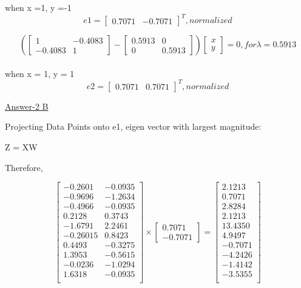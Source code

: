 \documentclass{report}
\begin{document}
\begin{flushleft}
when x =1, y =-1
\[
e1 = \begin{bmatrix}0.7071 & -0.7071\end{bmatrix}^T, normalized
\]

\begin{equation}
(\begin{bmatrix}
1 & -0.4083 \\
-0.4083 & 1
\end{bmatrix} - 
\begin{bmatrix}
0.5913 & 0 \\
0 & 0.5913
\end{bmatrix})
\begin{bmatrix}
x \\
y
\end{bmatrix}
= 0, for \lambda = 0.5913
\end{equation} \\

when x = 1, y = 1
\[
e2 = \begin{bmatrix}0.7071 & 0.7071\end{bmatrix}^T, normalized
\] \linebreak[2]

\underline {Answer-2 B}  \linebreak[2]

Projecting Data Points onto e1, eigen vector with largest magnitude:

Z = XW \linebreak[2]

Therefore,

\[
\begin{bmatrix}
-0.2601 & -0.0935 \\
-0.9696 & -1.2634 \\
-0.4966 & -0.0935 \\
0.2128 & 0.3743 \\
-1.6791 & 2.2461 \\
-0.26015 & 0.8423 \\
0.4493 & -0.3275 \\
1.3953 & -0.5615 \\
-0.0236 & -1.0294 \\
1.6318 & -0.0935 \\
\end{bmatrix}
\times
\begin{bmatrix}0.7071 \\
-0.7071
\end{bmatrix} =
\begin{bmatrix}
2.1213 \\
0.7071 \\
2.8284 \\
2.1213 \\
13.4350 \\
4.9497 \\
-0.7071 \\
-4.2426 \\
-1.4142 \\
-3.5355 \\
\end{bmatrix}
\] \linebreak[2]


\end{flushleft}
\end{document}
